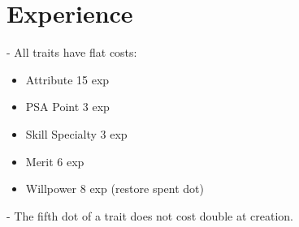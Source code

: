 \documentclass{article}
\begin{document}
\section{Experience}
- All traits have flat costs:
\begin{itemize}
	\item Attribute 15 exp
	\item PSA Point 3 exp
	\item Skill Specialty 3 exp
	\item Merit 6 exp
	\item Willpower 8 exp (restore spent dot)
\end{itemize}
- The fifth dot of a trait does not cost double at creation.
\end{document}
